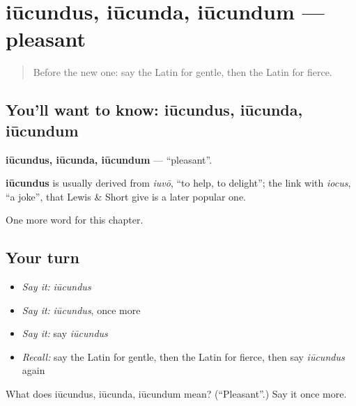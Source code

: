 \section[iūcundus, iūcunda, iūcundum]{iūcundus, iūcunda, iūcundum — pleasant}

\label{lesson:LA-C145-iucundus}



\begin{quote}
Before the new one: say the Latin for gentle, then the Latin for fierce.
\end{quote}

\subsection*{You'll want to know: iūcundus, iūcunda, iūcundum}
\textbf{iūcundus, iūcunda, iūcundum} — \textquotedblleft{}pleasant\textquotedblright{}.

\begin{cousinweb}
\textbf{iūcundus} is usually derived from \emph{iuvō}, \textquotedblleft{}to help, to delight\textquotedblright{}; the link with \emph{iocus}, \textquotedblleft{}a joke\textquotedblright{}, that Lewis \& Short give is a later popular one.
\end{cousinweb}

\begin{grammarlens}[title={What you've built}]
One more word for this chapter.
\end{grammarlens}

\subsection*{Your turn}
\begin{itemize}
\raggedright
  \item \emph{Say it:} \emph{iūcundus}
  \item \emph{Say it:} \emph{iūcundus}, once more
  \item \emph{Say it:} say \emph{iūcundus}
  \item \emph{Recall:} say the Latin for gentle, then the Latin for fierce, then say \emph{iūcundus} again
\end{itemize}

\begin{tcolorbox}[breakable,colback=teal!4,colframe=teal!35!black,title={Before you move on}]
What does iūcundus, iūcunda, iūcundum mean? (\textquotedblleft{}Pleasant\textquotedblright{}.) Say it once more.
\end{tcolorbox}
